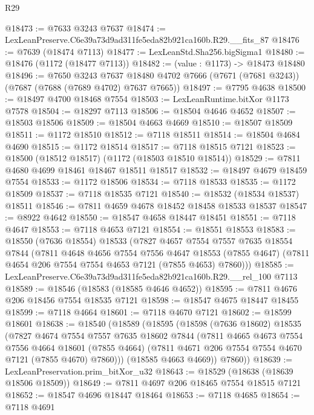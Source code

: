 \begin{lexlean}{R29}
\begin{coremodule}
@18473 := @7633 @3243 @7637
@18474 := LexLeanPreserve.C6e39a73d9ad311fe5eda82b921ca160b.R29.__fits_87
@18476 := @7639 (@18474 @7113)
@18477 := LexLeanStd.Sha256.bigSigma1
@18480 := @18476 (@1172 (@18477 @7113))
@18482 := (value : @1173) -> @18473 @18480
@18496 := @7650
    @3243
    @7637
    @18480
    @4702
    @7666
    (@7671 (@7681 @3243))
    (@7687 (@7688 (@7689 @4702) @7637 @7665))
@18497 := @7795 @4638
@18500 := @18497 @4700 @18468 @7554
@18503 := LexLeanRuntime.bitXor @1173 @7578
@18504 := @18297 @7113
@18506 := @18504 @4646 @4652
@18507 := @18503 @18506
@18509 := @18504 @4663 @4669
@18510 := @18507 @18509
@18511 := @1172 @18510
@18512 := @7118 @18511
@18514 := @18504 @4684 @4690
@18515 := @1172 @18514
@18517 := @7118 @18515 @7121
@18523 := @18500 (@18512 @18517) (@1172 (@18503 @18510 @18514))
@18529 := @7811 @4680 @4699 @18461 @18467 @18511 @18517
@18532 := @18497 @4679 @18459 @7554
@18533 := @1172 @18506
@18534 := @7118 @18533
@18535 := @1172 @18509
@18537 := @7118 @18535 @7121
@18540 := @18532 (@18534 @18537) @18511
@18546 := @7811 @4659 @4678 @18452 @18458 @18533 @18537
@18547 := @8922 @4642
@18550 := @18547 @4658 @18447 @18451
@18551 := @7118 @4647
@18553 := @7118 @4653 @7121
@18554 := @18551 @18553
@18583 := @18550
    (@7636 @18554)
    @18533
    (@7827
      @4657
      @7554
      @7557
      @7635
      @18554
      @7844
      (@7811
        @4648
        @4656
        @7554
        @7556
        @4647
        @18553
        (@7855 @4647)
        (@7811 @4654 @206 @7554 @7554 @4653 @7121 (@7855 @4653) @7860)))
@18585 := LexLeanPreserve.C6e39a73d9ad311fe5eda82b921ca160b.R29.__rel_100 @7113
@18589 := @18546 (@18583 (@18585 @4646 @4652))
@18595 := @7811 @4676 @206 @18456 @7554 @18535 @7121
@18598 := @18547 @4675 @18447 @18455
@18599 := @7118 @4664
@18601 := @7118 @4670 @7121
@18602 := @18599 @18601
@18638 := @18540
    (@18589
      (@18595
        (@18598
          (@7636 @18602)
          @18535
          (@7827
            @4674
            @7554
            @7557
            @7635
            @18602
            @7844
            (@7811
              @4665
              @4673
              @7554
              @7556
              @4664
              @18601
              (@7855 @4664)
              (@7811 @4671 @206 @7554 @7554 @4670 @7121 (@7855 @4670) @7860)))
          (@18585 @4663 @4669))
        @7860))
@18639 := LexLeanPreservation.prim_bitXor_u32
@18643 := @18529 (@18638 (@18639 @18506 @18509))
@18649 := @7811 @4697 @206 @18465 @7554 @18515 @7121
@18652 := @18547 @4696 @18447 @18464
@18653 := @7118 @4685
@18654 := @7118 @4691

\end{coremodule}
\end{lexlean}
